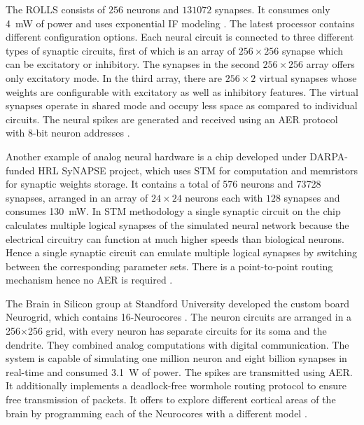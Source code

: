 The \ac{ROLLS} consists of $256$ neurons and $131072$ synapses.
It consumes only \SI{4}{\milli\watt} of power and uses exponential \ac{IF} modeling \cite{Qiao2015}.
The latest processor contains different configuration options.
Each neural circuit is connected to three different types of synaptic circuits, first of which is an array of $256\times256$ synapse which can be excitatory or inhibitory.
The synapses in the second $256\times256$ array offers only excitatory mode.
In the third array, there are $256\times2$ virtual synapses whose weights are configurable with excitatory as well as inhibitory features. The virtual synapses operate in shared mode and occupy less space as compared to individual circuits.
The neural spikes are generated and received using an \ac{AER} protocol with 8-bit neuron addresses \cite{Qiao2015}.

Another example of analog neural hardware is a chip \cite{Srinivasa2012} developed under \ac{DARPA}-funded \ac{HRL} \ac{SyNAPSE} project, which uses \ac{STM} for computation and memristors for synaptic weights storage.
It contains a total of 576 neurons and 73728 synapses, arranged in an array of $24\times24$ neurons each with $128$ synapses and consumes \SI{130}{\milli\watt}.
In \ac{STM} methodology a single synaptic circuit on the chip calculates multiple logical synapses of the simulated neural network because the electrical circuitry can function at much higher speeds than biological neurons.
Hence a single synaptic circuit can emulate multiple logical synapses by switching between the corresponding parameter sets.
There is a point-to-point routing mechanism hence no \ac{AER} is required \cite{Walter2015}. 

The Brain in Silicon group at Standford University developed the custom board Neurogrid, which contains 16-Neurocores \cite{Benjamin2014, Choudhary2012}.
The neuron circuits are arranged in a 256$\times$256 grid, with every neuron has separate circuits for its soma and the dendrite.
They combined analog computations with digital communication.
The system is capable of simulating one million neuron and eight billion synapses in real-time and consumed \SI{3.1}{\watt} of power.
The spikes are transmitted using \ac{AER}.
It additionally implements a deadlock-free wormhole routing protocol to ensure free transmission of packets.
It offers to explore different cortical areas of the brain by programming each of the Neurocores with a different model \cite{Merolla2014}.

